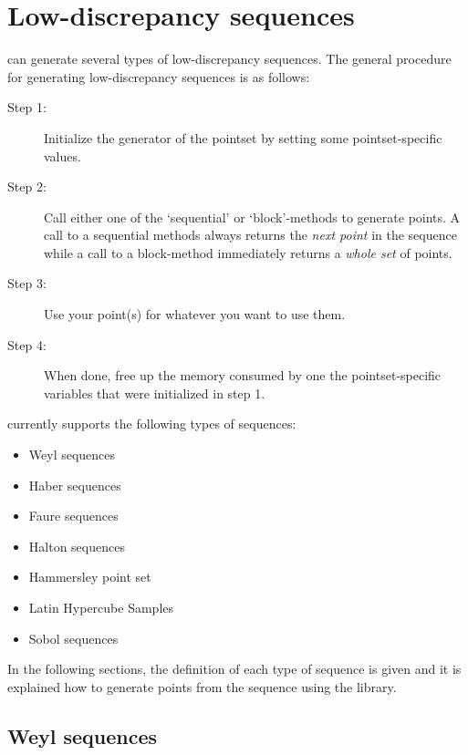 \chapter{Low-discrepancy sequences}

\qmcpack{} can generate several types of low-discrepancy sequences.  The general
procedure for generating low-discrepancy sequences is as follows:
\begin{description}
\item[Step 1:] Initialize the generator of the pointset by setting some
 pointset-specific values.
\item[Step 2:] Call either one of the `sequential' or `block'-methods to generate points.
 A call to a sequential methods always returns the \emph{next point} in the
 sequence while a call to a block-method immediately returns a \emph{whole set}
 of points.
\item[Step 3:] Use your point(s) for whatever you want to use them.
\item[Step 4:] When done, free up the memory consumed by one the
  pointset-specific variables that were initialized in step 1.
\end{description}
%
\qmcpack{} currently supports the following types of sequences:
%
\begin{itemize}
\item Weyl sequences
\item Haber sequences
\item Faure sequences
\item Halton sequences
\item Hammersley point set
\item Latin Hypercube Samples
\item Sobol sequences
\end{itemize}
%
In the following sections, the definition of each type of sequence is given and
it is explained how to generate points from the sequence using the \qmcpack{} library.

\section{Weyl sequences}

